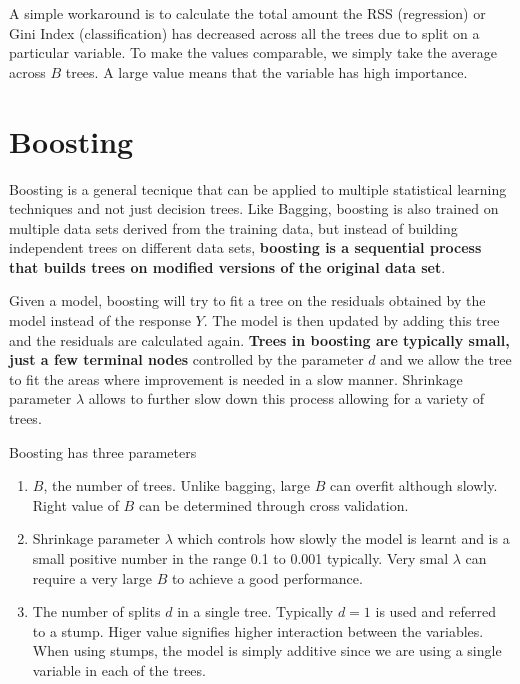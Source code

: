 \documentclass[../statistical_learning_notes.tex]{subfiles}
\begin{document}
    A simple workaround is to calculate the total amount the RSS (regression) or Gini Index (classification) has decreased across all the trees due to split on a particular variable. To make the values comparable, we simply take the average across $B$ trees. A large value means that the variable has high importance.
    

    

    \section{Boosting}
    Boosting is a general tecnique that can be applied to multiple statistical learning techniques and not just decision trees. Like Bagging, boosting is also trained on multiple data sets derived from the training data, but instead of building independent trees on different data sets, \textbf{boosting is a sequential process that builds trees on modified versions of the original data set}.\newline

    Given a model, boosting will try to fit a tree on the residuals obtained by the model instead of the response $Y$. The model is then updated by adding this tree and the residuals are calculated again. \textbf{Trees in boosting are typically small, just a few terminal nodes} controlled by the parameter $d$ and we allow the tree to fit the areas where improvement is needed in a slow manner. Shrinkage parameter $\lambda$ allows to further slow down this process allowing for a variety of trees.\newline

    Boosting has three parameters
    \begin{enumerate}
         \item $B$, the number of trees. Unlike bagging, large $B$ can overfit although slowly. Right value of $B$ can be determined through cross validation.
         \item Shrinkage parameter $\lambda$ which controls how slowly the model is learnt and is a small positive number in the range 0.1 to 0.001 typically. Very smal $\lambda$ can require a very large $B$ to achieve a good performance.
         \item The number of splits $d$ in a single tree. Typically $d=1$ is used and referred to a stump. Higer value signifies higher interaction between the variables. When using stumps, the model is simply additive since we are using a single variable in each of the trees.
     \end{enumerate}
\end{document}
